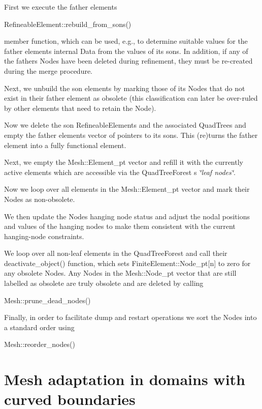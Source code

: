 \begin{DoxyItemize}
\begin{DoxyItemize}
\item First we execute the father element\textquotesingle{}s 
\begin{DoxyCode}
RefineableElement::rebuild\_from\_sons() 
\end{DoxyCode}
 member function, which can be used, e.\+g., to determine suitable values for the father element\textquotesingle{}s internal {\ttfamily Data} from the values of its sons. In addition, if any of the father\textquotesingle{}s {\ttfamily Nodes} have been deleted during refinement, they must be re-\/created during the merge procedure.
\item Next, we \textquotesingle{}unbuild\textquotesingle{} the son elements by marking those of its {\ttfamily Nodes} that do not exist in their father element as obsolete (this classification can later be over-\/ruled by other elements that need to retain the {\ttfamily Node}).
\item Now we delete the son {\ttfamily Refineable\+Elements} and the associated {\ttfamily Quad\+Trees} and empty the father element\textquotesingle{}s vector of pointers to its sons. This (re)turns the father element into a fully functional element.
\end{DoxyItemize}
\item Next, we empty the {\ttfamily Mesh\+::\+Element\+\_\+pt} vector and refill it with the currently active elements which are accessible via the {\ttfamily Quad\+Tree\+Forest} \textquotesingle{}s {\itshape \char`\"{}leaf nodes\char`\"{}}.
\item Now we loop over all elements in the {\ttfamily Mesh\+::\+Element\+\_\+pt} vector and mark their {\ttfamily Nodes} as non-\/obsolete.
\item We then update the {\ttfamily Nodes} hanging node status and adjust the nodal positions and values of the hanging nodes to make them consistent with the current hanging-\/node constraints.
\item We loop over all non-\/leaf elements in the {\ttfamily Quad\+Tree\+Forest} and call their {\ttfamily deactivate\+\_\+object()} function, which sets {\ttfamily Finite\+Element\+::\+Node\+\_\+pt}\mbox{[}n\mbox{]} to zero for any obsolete {\ttfamily Nodes}. Any {\ttfamily Nodes} in the {\ttfamily Mesh\+::\+Node\+\_\+pt} vector that are still labelled as obsolete are truly obsolete and are deleted by calling 
\begin{DoxyCode}
Mesh::prune\_dead\_nodes() 
\end{DoxyCode}

\item Finally, in order to facilitate dump and restart operations we sort the {\ttfamily Nodes} into a standard order using 
\begin{DoxyCode}
Mesh::reorder\_nodes() 
\end{DoxyCode}

\end{DoxyItemize}\hypertarget{index_Macro_element_meshes}{}\section{Mesh adaptation in domains with curved boundaries}\label{index_Macro_element_meshes}
